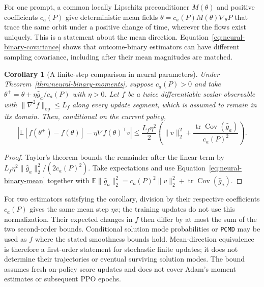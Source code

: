 \documentclass{article}
\newcommand{\enforcehalffinalproseline}{%
  \setlength{\parfillskip}{0pt plus .20\linewidth}}
\newcommand{\1}{\mathbf 1}
\newcommand{\E}{\mathbb E}
\newcommand{\pmd}{\texttt{PCMD}}
\newtheorem{corollary}[lemma]{Corollary}
\theoremstyle{remark}
\theoremstyle{definition}
\theoremstyle{plain}
\begin{document}
For one prompt, a common locally Lipschitz preconditioner $M(\theta)$ and
positive coefficients $c_a(P)$ give deterministic mean fields
$\dot\theta=c_a(P)M(\theta)\nabla_\theta P$ that trace the same orbit
under a positive change of time, wherever the flows exist uniquely.
This is a statement about the mean direction. Equation~\eqref{eq:neural-binary-covariance}
shows that outcome-binary estimators can have different sampling covariance,
including after their mean magnitudes are matched.

\begin{corollary}[A finite-step comparison in neural parameters]
\enforcehalffinalproseline
\label{cor:neural-binary-finite-step}
Under Theorem~\ref{thm:neural-binary-moments}, suppose $c_a(P)>0$ and take
$\theta^+=\theta+\eta\widehat g_a/c_a(P)$ with $\eta>0$. Let $f$ be a
twice differentiable scalar observable with
$\|\nabla^2f\|_{\mathrm{op}}\le L_f$ along every update segment, which
is assumed to remain in its domain. Then, conditional on the current policy,
\begin{equation}
 \left|\E[f(\theta^+)-f(\theta)]
       -\eta\nabla f(\theta)^\top v\right|
 \le\frac{L_f\eta^2}{2}
 \left(\|v\|_2^2+
       \frac{\operatorname{tr}\operatorname{Cov}(\widehat g_a)}{c_a(P)^2}
 \right).
 \label{eq:neural-binary-finite-step}
\end{equation}
\end{corollary}

\begin{proof}
\enforcehalffinalproseline
Taylor's theorem bounds the remainder after the linear term by
$L_f\eta^2\|\widehat g_a\|_2^2/(2c_a(P)^2)$. Take expectations and use
Equation~\eqref{eq:neural-binary-mean} together with
$\E\|\widehat g_a\|_2^2
=c_a(P)^2\|v\|_2^2+\operatorname{tr}\operatorname{Cov}(\widehat g_a)$.
\end{proof}

For two estimators satisfying the corollary, division by their respective
coefficients $c_a(P)$ gives the same mean step $\eta v$; the training updates
do not use this normalization. Their expected changes in $f$ then differ by
at most the sum of the two second-order bounds. Conditional solution mode
probabilities or \pmd{} may be used as $f$ where the stated smoothness bounds
hold. Mean-direction equivalence is
therefore a first-order statement for stochastic finite updates; it does
not determine their trajectories or eventual surviving solution modes.
The bound assumes fresh on-policy score updates and does not cover Adam's
moment estimates or subsequent PPO epochs.
\end{document}
